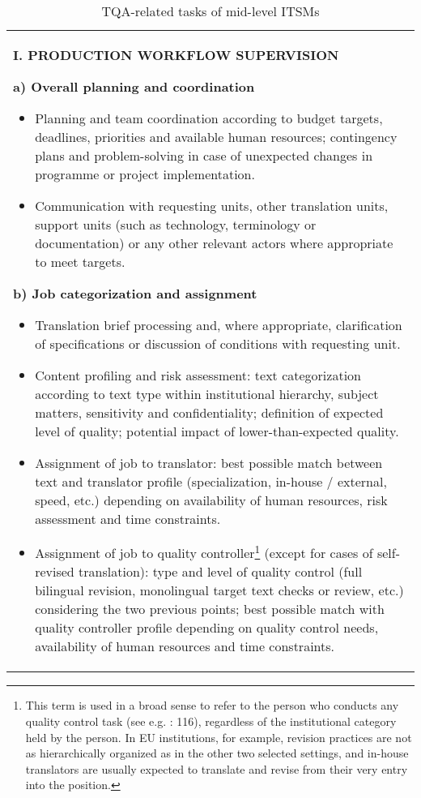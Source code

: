 \documentclass[output=paper]{langsci/langscibook}
\begin{document}
\begin{table}[p]

\caption{\label{tab:prietoramos:4} TQA-related tasks of mid-level ITSMs}
\footnotesize
\begin{tabularx}{\textwidth}{Q}
\lsptoprule 

 \parbox{.9\textwidth}{
\textbf{I. PRODUCTION WORKFLOW SUPERVISION} 



\textbf{a) Overall planning and coordination} 


\begin{itemize}
\item 
Planning and team coordination according to budget targets, deadlines, priorities and available human resources; contingency plans and problem-solving in case of unexpected changes in programme or project implementation.
\item 
Communication with requesting units, other translation units, support units (such as technology, terminology or documentation) or any other relevant actors where appropriate to meet targets.
\end{itemize}

\textbf{b) Job categorization and assignment} 


\begin{itemize}
\item 
Translation brief processing and, where appropriate, clarification of specifications or discussion of conditions with requesting unit.
\item 
Content profiling and risk assessment: text categorization according to text type within institutional hierarchy, subject matters, sensitivity and confidentiality; definition of expected level of quality; potential impact of lower-than-expected quality.
\item 
Assignment of job to translator: best possible match between text and translator profile (specialization, in-house / external, speed, etc.) depending on availability of human resources, risk assessment and time constraints.
\item 
Assignment of job to quality controller\footnote{This term is used in a broad sense to refer to the person who conducts any quality control task (see e.g. \citealt{Mossop2014}: 116), regardless of the institutional category held by the person. In EU institutions, for example, revision practices are not as hierarchically organized as in the other two selected settings, and in-house translators are usually expected to translate and revise from their very entry into the position.} (except for cases of self-revised translation): type and level of quality control (full bilingual revision, monolingual target text checks or review, etc.) considering the two previous points; best possible match with quality controller profile depending on quality control needs, availability of human resources and time constraints.
\end{itemize}

}
\end{tabularx}
\end{table}
\end{document}
